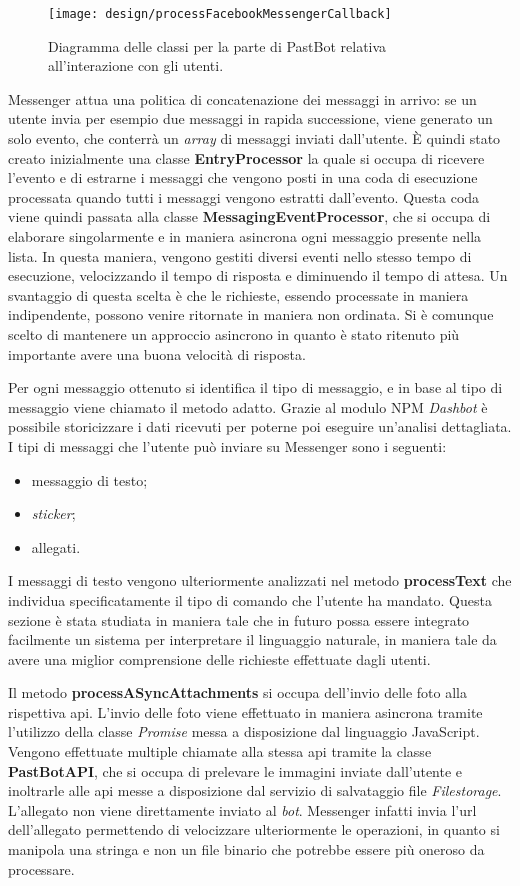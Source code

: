 \begin{figure}[H]
  \centering
  \texttt{[image: design/processFacebookMessengerCallback]}
  \caption{Diagramma delle classi per la parte di PastBot relativa
all'interazione con gli utenti.}
\end{figure}

Messenger attua una politica di concatenazione dei messaggi in arrivo: se un
utente invia per esempio due messaggi in rapida successione, viene generato un
solo evento, che conterrà un \textit{array} di messaggi inviati dall'utente. È
quindi stato creato inizialmente una classe \textbf{EntryProcessor} la quale si
occupa di ricevere l'evento e di estrarne i messaggi che vengono posti in una
coda di esecuzione processata quando tutti i messaggi vengono estratti
dall'evento.
Questa coda viene quindi passata alla classe \textbf{MessagingEventProcessor},
che si occupa di elaborare singolarmente e in maniera asincrona ogni messaggio
presente nella lista. In questa maniera, vengono gestiti diversi eventi nello
stesso tempo di esecuzione, velocizzando il tempo di risposta e diminuendo il
tempo di attesa. Un svantaggio di questa scelta è che le richieste,
essendo processate in maniera indipendente, possono venire ritornate in maniera
non ordinata. Si è comunque scelto di mantenere un approccio asincrono in
quanto è stato ritenuto più importante avere una buona velocità di risposta.

Per ogni messaggio ottenuto si identifica il tipo di messaggio, e in base al
tipo di messaggio viene chiamato il metodo adatto. Grazie al modulo NPM
\textit{Dashbot} è possibile storicizzare i dati ricevuti per poterne poi
eseguire un'analisi dettagliata.
I tipi di messaggi che l'utente può inviare su Messenger sono i seguenti:
\begin{itemize}
  \item messaggio di testo;
  \item \textit{sticker};
  \item allegati.
\end{itemize}
I messaggi di testo vengono ulteriormente analizzati nel metodo
\textbf{processText} che individua specificatamente il tipo di comando che
l'utente ha mandato. Questa sezione è stata studiata in maniera tale che in
futuro possa essere integrato facilmente un sistema per interpretare il
linguaggio naturale, in maniera tale da avere una miglior comprensione delle
richieste effettuate dagli utenti.

Il metodo \textbf{processASyncAttachments} si occupa dell'invio delle foto
alla rispettiva \gls{api}. L'invio delle foto viene effettuato in maniera
asincrona tramite l'utilizzo della classe \textit{Promise} messa a disposizione
dal linguaggio JavaScript. Vengono effettuate multiple chiamate alla stessa
\gls{api} tramite la classe \textbf{PastBotAPI}, che si occupa di prelevare le
immagini inviate dall'utente e inoltrarle alle \gls{api} messe a disposizione
dal servizio di salvataggio file \textit{Filestorage}.
L'allegato non viene direttamente inviato al \textit{bot}. Messenger infatti
invia l'\gls{url} dell'allegato permettendo di velocizzare ulteriormente le
operazioni, in quanto si manipola una stringa e non un file binario che
potrebbe essere più oneroso da processare.

